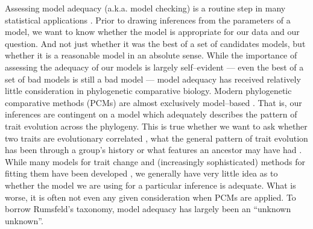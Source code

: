 \documentclass[a4paper,12pt]{article}
\begin{document}
\noindent Assessing model adequacy (a.k.a. model checking) is a routine step in many statistical applications \citep[e.g.][ch. 6]{Gelmanbook}. Prior to drawing inferences from the parameters of a model, we want to know whether the model is appropriate for our data and our question. And not just whether it was the best of a set of candidates models, but whether it is a reasonable model in an absolute sense. While the importance of assessing the adequacy of our models is largely self--evident --- even the best of a set of bad models is still a bad model --- model adequacy has received relatively little consideration in phylogenetic comparative biology. Modern phylogenetic comparative methods (PCMs) are almost exclusively model--based \citep[recently reviewed in][]{Omeara2012, PennellHarmon}. That is, our inferences are contingent on a model which adequately describes the pattern of trait evolution across the phylogeny. This is true whether we want to ask whether two traits are evolutionary correlated \citep[e.g.][]{Felsenstein1985, Grafen1989, HarveyPagel1991}, what the general pattern of trait evolution has been through a group's history \citep[e.g.][]{Mooers1999, Harmon2010, Hunt2012} or what features an ancestor may have had \citep[e.g.][]{Schluter1997, Huelsenbeck2003}. While many models for trait change and (increasingly sophisticated) methods for fitting them have been developed \citep[e.g.][]{Felsenstein1985, Hansen1997, ButlerKing2004, Omeara2006, Eastman2011, Beaulieu2012}, we generally have very little idea as to whether the model we are using for a particular inference is adequate. What is worse, it is often not even any given consideration when PCMs are applied. To borrow Rumsfeld's taxonomy, model adequacy has largely been an ``unknown unknown''.
\end{document}
